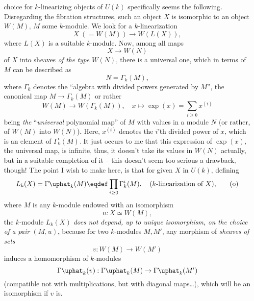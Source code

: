 choice for $k$-linearizing objects of $U(k)$ specifically seems the
following. Disregarding the fibration structures, such an object $X$
is isomorphic to an object $W(M)$, $M$ some $k$-module. We look for a
$k$-linearization
\begin{equation}
  \label{eq:111.m}
  X\;(=W(M)) \to W(L(X)),\tag{m}
\end{equation}
where $L(X)$ is a suitable $k$-module. Now, among all maps
\[X\to W(N)\]
of $X$ into sheaves \emph{of the type $W(N)$}, there is a universal
one, which in terms of $M$ can be described as
\[N=\Gamma_k(M),\]
where $\Gamma_k$ denotes the ``algebra with divided powers generated
by $M$'', the canonical map $M\to \Gamma_k(M)$ or rather
\begin{equation}
  \label{eq:111.n}
  W(M)\to W(\Gamma_k(M)), \quad
  x\mapsto \exp(x)=\sum_{i\ge0} x^{(i)}\tag{n}
\end{equation}
being \emph{the} ``\emph{universal} polynomial map'' of $M$ with
values in a module $N$ (or rather, of $W(M)$ into $W(N)$). Here,
$x^{(i)}$ denotes the $i$'th divided power of $x$, which is an element
of $\Gamma_k^i(M)$. It just occurs to me that this expression of
$\exp(x)$, the universal map, is infinite, thus, it doesn't take its
values in $W(N)$ actually, but in a suitable completion of it -- this
doesn't seem too serious a drawback, though! The point I wish to make
here, is that for given $X$ in $U(k)$, defining
\begin{equation}
  \label{eq:111.o}
  L_k(X) = \Gamma\uphat_k(M) \eqdef \prod_{i\ge0} \Gamma_k^i(M),
  \quad\text{($k$-linearization of $X$),}\tag{o}
\end{equation}
where $M$ is any $k$-module endowed with an isomorphism
\[u: X\simeq W(M),\]
the $k$-module $L_k(X)$ \emph{does not depend, up to unique
  isomorphism, on the choice of a pair $(M,u)$}, because for two
$k$-modules $M,M'$, any morphism of \emph{sheaves of sets}
\[v:W(M)\to W(M')\]
induces a homomorphism of $k$-modules
\[\Gamma\uphat_k(v): \Gamma\uphat_k(M) \to \Gamma\uphat_k(M')\]
(compatible not with multiplications, but with diagonal maps\dots),
which will be an isomorphism if $v$ is.

